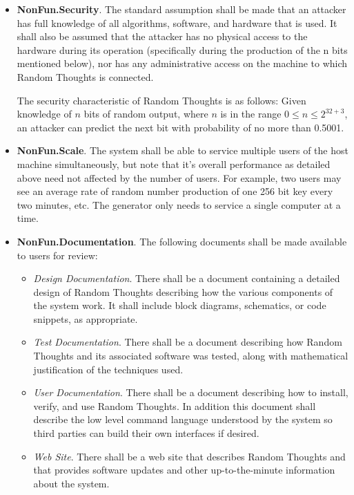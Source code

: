 \begin{itemize}
\item \textbf{NonFun.Security}. The standard assumption shall be made that an attacker has full
  knowledge of all algorithms, software, and hardware that is used. It shall also be assumed
  that the attacker has no physical access to the hardware during its operation (specifically
  during the production of the n bits mentioned below), nor has any administrative access on the
  machine to which Random Thoughts is connected.

  The security characteristic of Random Thoughts is as follows: Given knowledge of $n$ bits of
  random output, where $n$ is in the range $0 \le n \le 2^{32+3}$, an attacker can predict the
  next bit with probability of no more than 0.5001.

\item \textbf{NonFun.Scale}. The system shall be able to service multiple users of the host
  machine simultaneously, but note that it's overall performance as detailed above need not
  affected by the number of users. For example, two users may see an average rate of random
  number production of one 256 bit key every two minutes, etc. The generator only needs to
  service a single computer at a time.

\item \textbf{NonFun.Documentation}. The following documents shall be made available to users
  for review:
  \begin{itemize}
  \item \textit{Design Documentation}. There shall be a document containing a detailed design of
    Random Thoughts describing how the various components of the system work. It shall include
    block diagrams, schematics, or code snippets, as appropriate.
  \item \textit{Test Documentation}. There shall be a document describing how Random Thoughts
    and its associated software was tested, along with mathematical justification of the
    techniques used.
  \item \textit{User Documentation}. There shall be a document describing how to install,
    verify, and use Random Thoughts. In addition this document shall describe the low level
    command language understood by the system so third parties can build their own interfaces if
    desired.
  \item \textit{Web Site}. There shall be a web site that describes Random Thoughts and that
    provides software updates and other up-to-the-minute information about the system.
  \end{itemize}


\end{itemize}
